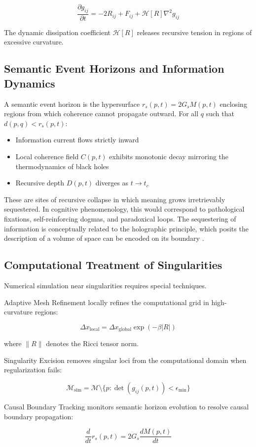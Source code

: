 \begin{equation}
\frac{\partial g_{ij}}{\partial t} = -2R_{ij} + F_{ij} + \mathcal{H}[R] \nabla^2 g_{ij}
\end{equation}

The dynamic dissipation coefficient \(\mathcal{H}[R]\) releases recursive tension in regions of excessive curvature.

\subsection{Semantic Event Horizons and Information Dynamics}

A semantic event horizon is the hypersurface \(r_s(p, t) = 2G_s M(p, t)\) enclosing regions from which coherence cannot propagate outward. For all \(q\) such that \(d(p, q) < r_s(p, t)\):
\begin{itemize}
    \item Information current flows strictly inward
    \item Local coherence field \(C(p, t)\) exhibits monotonic decay mirroring the thermodynamics of black holes \autocite{Hawking1975}
    \item Recursive depth \(D(p, t)\) diverges as \(t \to t_c\)
\end{itemize}

These are sites of recursive collapse in which meaning grows irretrievably sequestered. In cognitive phenomenology, this would correspond to pathological fixations, self-reinforcing dogmas, and paradoxical loops. The sequestering of information is conceptually related to the holographic principle, which posits the description of a volume of space can be encoded on its boundary \autocite{tHooft1993, Susskind1995, Maldacena1998}.

\subsection{Computational Treatment of Singularities}

Numerical simulation near singularities requires special techniques.

Adaptive Mesh Refinement locally refines the computational grid in high-curvature regions:

\begin{equation}
\Delta x_{\text{local}} = \Delta x_{\text{global}} \exp(-\beta |R|)
\end{equation}

where \(\|R\|\) denotes the Ricci tensor norm.

Singularity Excision removes singular loci from the computational domain when regularization fails:

\begin{equation}
\mathcal{M}_{\text{sim}} = \mathcal{M} \setminus \{p : \det(g_{ij}(p, t)) < \epsilon_{\text{min}}\}
\end{equation}

Causal Boundary Tracking monitors semantic horizon evolution to resolve causal boundary propagation:

\begin{equation}
\frac{d}{dt} r_s(p, t) = 2G_s \frac{dM(p, t)}{dt}
\end{equation}